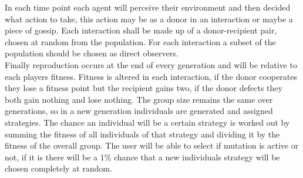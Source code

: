 \documentclass[twoside,twocolumn]{article}
\begin{document}
In each time point each agent will perceive their environment and then decided what action to take, this action may be as a donor in an interaction or maybe a piece of gossip. Each interaction shall be made up of a donor-recipient pair, chosen at random from the population. For each interaction a subset of the population should be chosen as direct observers.\\
Finally reproduction occurs at the end of every generation and will be relative to each players fitness. Fitness is altered in each interaction, if the donor cooperates they lose a fitness point but the recipient gains two, if the donor defects they both gain nothing and lose nothing. The group size remains the same over generations, so in a new generation individuals are generated and assigned strategies. The chance an individual will be a certain strategy is worked out by summing the fitness of all individuals of that strategy and dividing it by the fitness of the overall group. The user will be able to select if mutation is active or not, if it is there will be a 1\% chance that a new individuals strategy will be chosen completely at random.
\end{document}
